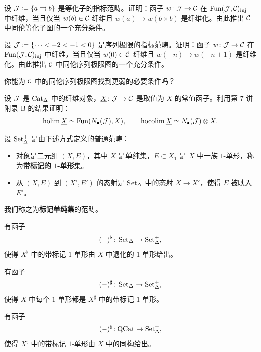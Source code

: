 \begin{exercise}\label{L8-3.5}
设 $\mathcal{J}\coloneqq \{a\rightrightarrows b\}$ 是等化子的指标范畴。证明：函子 $w\colon \mathcal{J}\to\mathcal{C}$ 在 $\operatorname{Fun}(\mathcal{J},\mathcal{C})_{\mathrm{inj}}$ 中纤维，当且仅当 $w(b)\in\mathcal{C}$ 纤维且 $w(a)\to w(b\times b)$ 是纤维化。由此推出 $\mathcal{C}$ 中同伦等化子图的一个充分条件。
\end{exercise}

\begin{exercise}\label{L8-3.6}
设 $\mathcal{J}\coloneqq \{\cdots<-2<-1<0\}$ 是序列极限的指标范畴。证明：函子 $w\colon \mathcal{J}\to\mathcal{C}$ 在 $\operatorname{Fun}(\mathcal{J},\mathcal{C})_{\mathrm{inj}}$ 中纤维，当且仅当 $w(0)\in\mathcal{C}$ 纤维且 $w(-n)\to w(-n+1)$ 是纤维化。由此推出 $\mathcal{C}$ 中同伦序列极限图的一个充分条件。
\end{exercise}

\begin{exercise}\label{L8-3.7}
你能为 $\mathcal{C}$ 中的同伦序列极限图找到更弱的必要条件吗？
\end{exercise}

\begin{exercise}\label{L8-3.8}
设 $\mathcal{J}$ 是 $\operatorname{Cat}_\Delta$ 中的纤维对象，$\underline{X}\colon \mathcal{J}\to\mathcal{C}$ 是取值为 $X$ 的常值函子。利用第 7 讲附录 B 的结果证明：
\[
\operatorname{holim} \underline{X}\simeq \operatorname{Fun}(N_\bullet(\mathcal{J}),X),\qquad
\operatorname{hocolim} \underline{X}\simeq N_\bullet(\mathcal{J})\otimes X.
\]
\end{exercise}


\begin{definition}\label{L8-A.1}
设 $\operatorname{Set}^+_\Delta$ 是由下述方式定义的普通范畴：
\begin{itemize}[leftmargin=2.2em,itemsep=0.1em]
\item 对象是二元组 $(X,E)$，其中 $X$ 是单纯集，$E\subset X_1$ 是 $X$ 中一族 $1$-单形，称为\textbf{带标记的 $1$-单形}集。
\item 从 $(X,E)$ 到 $(X',E')$ 的态射是 $\operatorname{Set}_\Delta$ 中的态射 $X\to X'$，使得 $E$ 被映入 $E'$。
\end{itemize}
我们称之为\textbf{标记单纯集}的范畴。
\end{definition}

\begin{construction}\label{L8-A.2}
有函子
\[
(-)^\flat\colon \operatorname{Set}_\Delta\to \operatorname{Set}^+_\Delta ,
\]
使得 $X^\flat$ 中的带标记 $1$-单形由 $X$ 中退化的 $1$-单形给出。

有函子
\[
(-)^\sharp\colon \operatorname{Set}_\Delta\to \operatorname{Set}^+_\Delta ,
\]
使得 $X$ 中每个 $1$-单形都是 $X^\sharp$ 中的带标记 $1$-单形。

有函子
\[
(-)^\natural\colon \mathrm{QCat}\to \operatorname{Set}^+_\Delta ,
\]
使得 $X^\natural$ 中的带标记 $1$-单形由 $X$ 中的同构给出。
\end{construction}

